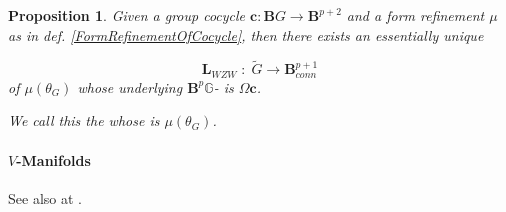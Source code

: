\documentclass[12pt,titlepage]{article}
\theoremstyle{plain}
\newtheorem{prop}{Proposition}
\theoremstyle{definition}
\theoremstyle{remark}
\begin{document}
\begin{prop}
\label{WZWTermFromCocycle}\hypertarget{WZWTermFromCocycle}{}
Given a group cocycle $\mathbf{c} \colon \mathbf{B}G \to \mathbf{B}^{p+2}$ and a form refinement $\mu$ as in def. \ref{FormRefinementOfCocycle}, then there exists an essentially unique 

\begin{displaymath}
\mathbf{L}_{WZW}
  \;\colon\;
  \tilde G \longrightarrow \mathbf{B}^{p+1}_{conn}
\end{displaymath}
of $\mu(\theta_G)$ whose underlying $\mathbf{B}^p\mathbb{G}$- is $\Omega \mathbf{c}$.

We call this the \emph{} whose  is $\mu(\theta_G)$.

\end{prop}
\hypertarget{Manifolds}{}\paragraph*{{$V$-Manifolds}}\label{Manifolds}

See also at \emph{}.
\end{document}
